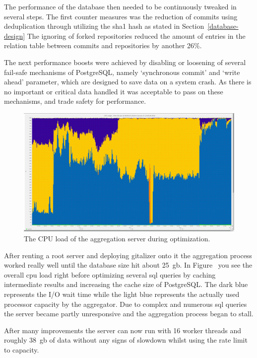 The performance of the database then needed to be continuously tweaked in several steps.
The first counter measures was the reduction of commits using deduplication through utilizing the \ac{sha1} hash as stated in Section~\ref{database-design}
The ignoring of forked repositories reduced the amount of entries in the relation table between commits and repositories by another 26\%.

The next performance boosts were achieved by disabling or loosening of several fail-safe mechanisms of PostgreSQL, namely `synchronous commit' and `write ahead' parameter, which are designed to save data on a system crash.
As there is no important or critical data handled it was acceptable to pass on these mechanisms, and trade safety for performance.

\begin{figure}[H]
\includegraphics[scale=0.25]{./pic/server-graphs/query-refactoring}
\centering
\caption{The CPU load of the aggregation server during optimization.}\label{fig:cpu-load}
\end{figure}

After renting a root server and deploying gitalizer onto it the aggregation process worked really well until the database size hit about 25~\ac{gb}.
In Figure~\label{fig:cpu-load} you see the overall \ac{cpu} load right before optimizing several \ac{sql} queries by caching intermediate results and increasing the cache size of PostgreSQL.
The dark blue represents the I/O wait time while the light blue represents the actually used processor capacity by the aggregator.
Due to complex and numerous \ac{sql} queries the server became partly unresponsive and the aggregation process began to stall.

After many improvements the server can now run with 16 worker threads and roughly 38~\ac{gb} of data without any signs of slowdown whilst using the rate limit to capacity.


